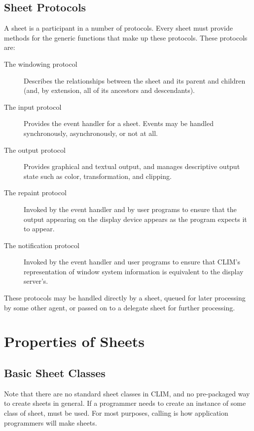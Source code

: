 \section {Sheet Protocols}

A sheet is a participant in a number of protocols.  Every sheet must provide
methods for the generic functions that make up these protocols.  These protocols
are:

\begin{description}
\item [The windowing protocol] Describes the relationships between the sheet and
its parent and children (and, by extension, all of its ancestors and
descendants).

\item [The input protocol] Provides the event handler for a sheet.  Events may
be handled synchronously, asynchronously, or not at all.

\item [The output protocol] Provides graphical and textual output, and manages
descriptive output state such as color, transformation, and clipping.

\item [The repaint protocol] Invoked by the event handler and by user programs
to ensure that the output appearing on the display device appears as the program
expects it to appear.

\item [The notification protocol] Invoked by the event handler and user programs
to ensure that CLIM's representation of window system information is equivalent
to the display server's.
\end{description}

These protocols may be handled directly by a sheet, queued for later processing
by some other agent, or passed on to a delegate sheet for further processing.


\chapter {Properties of Sheets}
\label {sheet-properties}

\section {Basic Sheet Classes}

Note that there are no standard sheet classes in CLIM, and no pre-packaged way
to create sheets in general.  If a programmer needs to create an instance of
some class of sheet,  must be used.  For most purposes,
calling  is how application programmers will make sheets.

